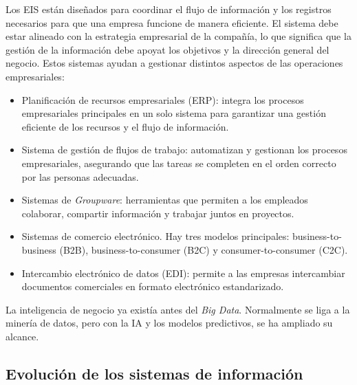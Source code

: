 Los EIS están diseñados para coordinar el flujo de información y los registros necesarios para que una empresa funcione de manera eficiente. El sistema debe estar alineado con la estrategia empresarial de la compañía, lo que significa que la gestión de la información debe apoyat los objetivos y la dirección general del negocio. Estos sistemas ayudan a gestionar distintos aspectos de las operaciones empresariales:
\begin{itemize}
\item Planificación de recursos empresariales (ERP): integra los procesos empresariales principales en un solo sistema para garantizar una gestión eficiente de los recursos y el flujo de información.
\item Sistema de gestión de flujos de trabajo: automatizan y gestionan los procesos empresariales, asegurando que las tareas se completen en el orden correcto por las personas adecuadas.
\item Sistemas de \textit{Groupware}: herramientas que permiten a los empleados colaborar, compartir información y trabajar juntos en proyectos.
\item Sistemas de comercio electrónico. Hay tres modelos principales: business-to-business (B2B), business-to-consumer (B2C) y consumer-to-consumer (C2C).
\item Intercambio electrónico de datos (EDI): permite a las empresas intercambiar documentos comerciales en formato electrónico estandarizado.
\end{itemize}

La inteligencia de negocio ya existía antes del \textit{Big Data}. Normalmente se liga a la minería de datos, pero con la IA y los modelos predictivos, se ha ampliado su alcance. 

\subsection{Evolución de los sistemas de información}

